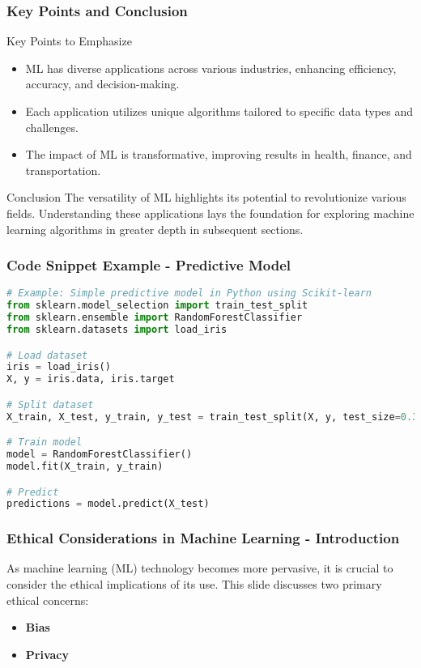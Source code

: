 \documentclass[aspectratio=169]{beamer}
\begin{document}
\begin{frame}[fragile]
    \frametitle{Key Points and Conclusion}
    \begin{block}{Key Points to Emphasize}
        \begin{itemize}
            \item ML has diverse applications across various industries, enhancing efficiency, accuracy, and decision-making.
            \item Each application utilizes unique algorithms tailored to specific data types and challenges.
            \item The impact of ML is transformative, improving results in health, finance, and transportation.
        \end{itemize}
    \end{block}

    \begin{block}{Conclusion}
    The versatility of ML highlights its potential to revolutionize various fields. Understanding these applications lays the foundation for exploring machine learning algorithms in greater depth in subsequent sections.
    \end{block}
\end{frame}

\begin{frame}[fragile]
    \frametitle{Code Snippet Example - Predictive Model}
    \begin{lstlisting}[language=Python]
# Example: Simple predictive model in Python using Scikit-learn
from sklearn.model_selection import train_test_split
from sklearn.ensemble import RandomForestClassifier
from sklearn.datasets import load_iris

# Load dataset
iris = load_iris()
X, y = iris.data, iris.target

# Split dataset
X_train, X_test, y_train, y_test = train_test_split(X, y, test_size=0.3, random_state=42)

# Train model
model = RandomForestClassifier()
model.fit(X_train, y_train)

# Predict
predictions = model.predict(X_test)
    \end{lstlisting}
\end{frame}

\begin{frame}[fragile]
    \frametitle{Ethical Considerations in Machine Learning - Introduction}
    As machine learning (ML) technology becomes more pervasive, it is crucial to consider the ethical implications of its use. This slide discusses two primary ethical concerns: 
    \begin{itemize}
        \item \textbf{Bias}
        \item \textbf{Privacy}
    \end{itemize}
\end{frame}
\end{document}
